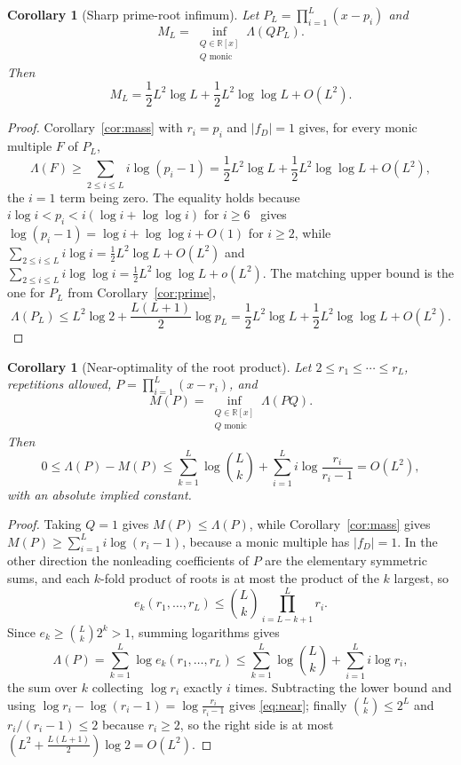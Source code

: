 \documentclass[11pt]{article}
\newtheorem{corollary}[theorem]{Corollary}
\newcommand{\R}{\mathbb R}
\begin{document}
\begin{corollary}[Sharp prime-root infimum]\label{cor:infimum}
Let $P_L=\prod_{i=1}^L(x-p_i)$ and
\[
  M_L=\inf_{\substack{Q\in\R[x]\\ Q\text{ monic}}}\Lambda(QP_L).
\]
Then
\[
  M_L=\frac12L^2\log L+\frac12L^2\log\log L+O(L^2).
\]
\end{corollary}

\begin{proof}
Corollary~\ref{cor:mass} with $r_i=p_i$ and $|f_D|=1$ gives, for every monic
multiple $F$ of $P_L$,
\[
  \Lambda(F)\ge\sum_{2\le i\le L}i\log(p_i-1)
  =\frac12L^2\log L+\frac12L^2\log\log L+O(L^2),
\]
the $i=1$ term being zero.  The equality holds because
$i\log i<p_i<i(\log i+\log\log i)$ for $i\ge6$~\cite{rosser-schoenfeld}
gives $\log(p_i-1)=\log i+\log\log i+O(1)$ for $i\ge2$, while
$\sum_{2\le i\le L}i\log i=\frac12L^2\log L+O(L^2)$ and
$\sum_{2\le i\le L}i\log\log i=\frac12L^2\log\log L+o(L^2)$.  The matching upper
bound is the one for $P_L$ from Corollary~\ref{cor:prime},
\[
  \Lambda(P_L)\le L^2\log2+\frac{L(L+1)}2\log p_L
  =\frac12L^2\log L+\frac12L^2\log\log L+O(L^2).
\]
\end{proof}

\begin{corollary}[Near-optimality of the root product]\label{cor:near}
Let $2\le r_1\le\cdots\le r_L$, repetitions allowed,
$P=\prod_{i=1}^L(x-r_i)$, and
\[
  M(P)=\inf_{\substack{Q\in\R[x]\\ Q\text{ monic}}}\Lambda(PQ).
\]
Then
\begin{equation}\label{eq:near}
  0\le\Lambda(P)-M(P)
  \le\sum_{k=1}^L\log\binom Lk
    +\sum_{i=1}^L i\log\frac{r_i}{r_i-1}
  =O(L^2),
\end{equation}
with an absolute implied constant.
\end{corollary}

\begin{proof}
Taking $Q=1$ gives $M(P)\le\Lambda(P)$, while Corollary~\ref{cor:mass} gives
$M(P)\ge\sum_{i=1}^L i\log(r_i-1)$, because a monic multiple has $|f_D|=1$.
In the other direction the nonleading coefficients of $P$ are the elementary
symmetric sums, and each $k$-fold product of roots is at most the product of
the $k$ largest, so
\[
  e_k(r_1,\ldots,r_L)\le\binom Lk\prod_{i=L-k+1}^{L}r_i .
\]
Since $e_k\ge\binom Lk2^k>1$, summing logarithms gives
\[
  \Lambda(P)=\sum_{k=1}^L\log e_k(r_1,\ldots,r_L)
  \le\sum_{k=1}^L\log\binom Lk+\sum_{i=1}^L i\log r_i ,
\]
the sum over $k$ collecting $\log r_i$ exactly $i$ times.
Subtracting the lower bound and using
$\log r_i-\log(r_i-1)=\log\frac{r_i}{r_i-1}$ gives \eqref{eq:near}; finally
$\binom Lk\le2^L$ and $r_i/(r_i-1)\le2$ because $r_i\ge2$, so the right side
is at most $(L^2+\frac{L(L+1)}2)\log2=O(L^2)$.
\end{proof}
\end{document}

